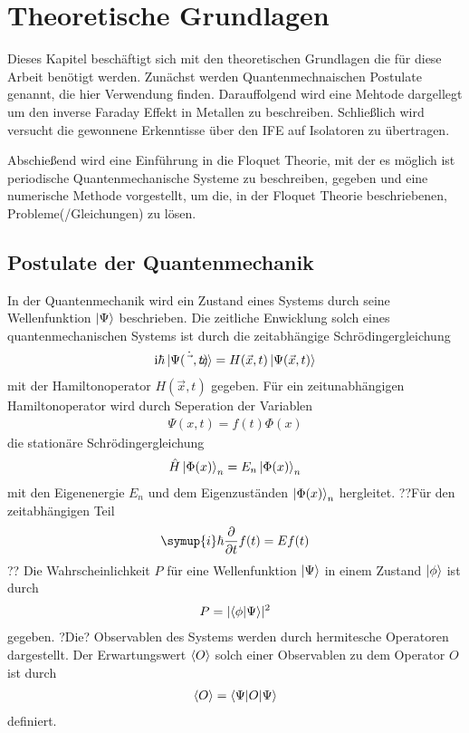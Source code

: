 \chapter{Theoretische Grundlagen}
\label{theo}
Dieses Kapitel beschäftigt sich mit den
theoretischen Grundlagen die für diese Arbeit benötigt
werden. Zunächst werden
Quantenmechnaischen Postulate genannt,
die hier Verwendung finden.
Darauffolgend wird eine Mehtode dargellegt
um den inverse Faraday Effekt in Metallen
zu beschreiben. Schließlich wird versucht
die gewonnene Erkenntisse über den
IFE auf Isolatoren zu übertragen.

Abschießend wird eine Einführung in
die Floquet Theorie, mit der es möglich
ist periodische Quantenmechanische Systeme
zu beschreiben, gegeben
und eine numerische Methode vorgestellt,
um die, in der Floquet Theorie beschriebenen,
Probleme(/Gleichungen)  zu lösen.

\section{Postulate der Quantenmechanik}
In der Quantenmechanik wird
ein Zustand eines Systems durch seine Wellenfunktion $\ket{\Psi}$
beschrieben. Die zeitliche Enwicklung solch
eines quantenmechanischen Systems ist durch die
zeitabhängige Schrödingergleichung
\begin{align}
\mathrm{i}\hbar \ket{\dot{\Psi(\vec{x},t)}}=  H(\vec{x},t) \ket{\Psi(\vec{x},t)} \label{eqn:schrodinger}
\end{align}
mit der Hamiltonoperator $H(\vec{x},t)$
gegeben.
Für ein zeitunabhängigen Hamiltonoperator wird durch
Seperation der Variablen
\begin{align}
  \Psi(x,t)=f(t)\Phi(x)
\end{align}
die stationäre Schrödingergleichung
\begin{align}
\hat H \ket{\Phi(x)}_n=E_n\ket{\Phi(x)}_n \label{eqn:stationSG}
\end{align}
mit den Eigenenergie $E_n$ und dem
Eigenzuständen $\ket{\Phi(x)}_n$
hergleitet.
??Für den zeitabhängigen Teil
\begin{align}
\symup{i}\hbar\frac{\partial}{\partial t}f(t)=Ef(t)
\end{align}
??
Die Wahrscheinlichkeit $P$ für eine
Wellenfunktion $\ket{\Psi}$ in einem
Zustand $\ket{\phi}$ ist
durch
\begin{align}
  P=\lvert\braket{\phi\vert\Psi}\rvert^2
\end{align}
gegeben.
?Die? Observablen des Systems werden durch hermitesche
Operatoren dargestellt.
Der Erwartungswert $\braket{O}$ solch einer Observablen zu
dem Operator $O$
ist durch
\begin{align}
\braket{O}=\braket{\Psi\lvert O\rvert\Psi}
\end{align}
definiert.
\cite{schwabl}


